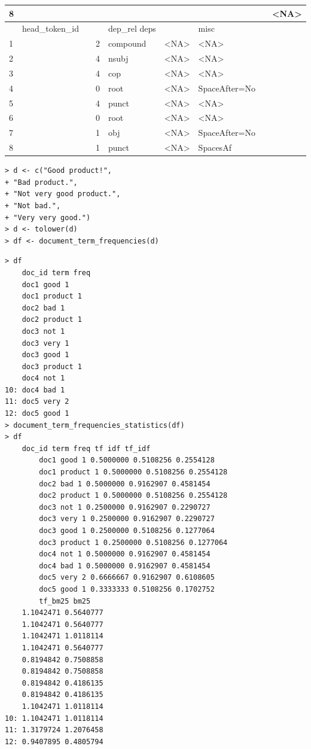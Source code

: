 \documentclass[11pt,openany,executivepaper]{book}
\begin{document}
\begin{center}
{\begin{tabular}{|l|l|l|l|l|l|l|l|l|}
\hline
8 &  &  &  &  &  &  &  & <NA> \\
\hline
 & head\_token\_id &  &  & dep\_rel deps &  & misc &  &  \\
\hline
1 &  &  & 2 & compound & <NA> & <NA> &  &  \\
\hline
2 &  &  & 4 & nsubj & <NA> & <NA> &  &  \\
\hline
3 &  &  & 4 & cop & <NA> & <NA> &  &  \\
\hline
4 &  &  & 0 & root & <NA> & SpaceAfter=No &  &  \\
\hline
5 &  &  & 4 & punct & <NA> & <NA> &  &  \\
\hline
6 &  &  & 0 & root & <NA> & <NA> &  &  \\
\hline
7 &  &  & 1 & obj & <NA> & SpaceAfter=No &  &  \\
\hline
8 &  &  & 1 & punct & <NA> & SpacesAf &  &  \\
\hline
\end{tabular}
}
\end{center}

\begin{verbatim}
> d <- c("Good product!",
+ "Bad product.",
+ "Not very good product.",
+ "Not bad.",
+ "Very very good.")
> d <- tolower(d)
> df <- document_term_frequencies(d)
\end{verbatim}

\begin{verbatim}
> df
    doc_id term freq
    doc1 good 1
    doc1 product 1
    doc2 bad 1
    doc2 product 1
    doc3 not 1
    doc3 very 1
    doc3 good 1
    doc3 product 1
    doc4 not 1
10: doc4 bad 1
11: doc5 very 2
12: doc5 good 1
> document_term_frequencies_statistics(df)
> df
    doc_id term freq tf idf tf_idf
        doc1 good 1 0.5000000 0.5108256 0.2554128
        doc1 product 1 0.5000000 0.5108256 0.2554128
        doc2 bad 1 0.5000000 0.9162907 0.4581454
        doc2 product 1 0.5000000 0.5108256 0.2554128
        doc3 not 1 0.2500000 0.9162907 0.2290727
        doc3 very 1 0.2500000 0.9162907 0.2290727
        doc3 good 1 0.2500000 0.5108256 0.1277064
        doc3 product 1 0.2500000 0.5108256 0.1277064
        doc4 not 1 0.5000000 0.9162907 0.4581454
        doc4 bad 1 0.5000000 0.9162907 0.4581454
        doc5 very 2 0.6666667 0.9162907 0.6108605
        doc5 good 1 0.3333333 0.5108256 0.1702752
        tf_bm25 bm25
    1.1042471 0.5640777
    1.1042471 0.5640777
    1.1042471 1.0118114
    1.1042471 0.5640777
    0.8194842 0.7508858
    0.8194842 0.7508858
    0.8194842 0.4186135
    0.8194842 0.4186135
    1.1042471 1.0118114
10: 1.1042471 1.0118114
11: 1.3179724 1.2076458
12: 0.9407895 0.4805794
\end{verbatim}
\end{document}
